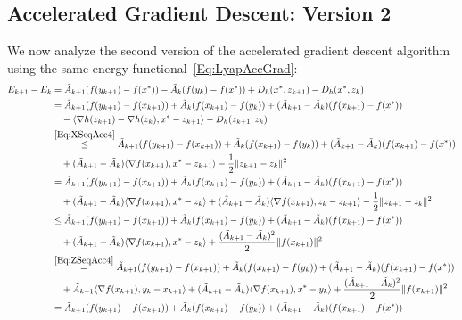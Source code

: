 \documentclass[11pt]{article}
\theoremstyle{plain}
\begin{document}
\subsection{Accelerated Gradient Descent: Version 2}
We now analyze the second version of the accelerated gradient descent algorithm using the same energy functional~\eqref{Eq:LyapAccGrad}:
\begin{align*}
E_{k+1} - E_k &= \tilde A_{k+1}(f(y_{k+1}) - f(x^\ast)) - \tilde A_{k}(f(y_{k}) - f(x^\ast)) + D_h(x^\ast, z_{k+1}) - D_h(x^\ast, z_{k}) \\
& = \tilde A_{k+1}(f(y_{k+1}) - f(x_{k+1})) + \tilde A_{k}(f(x_{k+1}) - f(y_{k})) + (\tilde A_{k+1} - \tilde A_k)(f(x_{k+1}) - f(x^\ast)) \\
&\quad - \langle \nabla h(z_{k+1}) - \nabla h(z_k), x^\ast - z_{k+1}\rangle - D_h(z_{k+1}, z_k)\\
& \overset{\eqref{Eq:XSeqAcc4}}{\leq} \tilde A_{k+1}(f(y_{k+1}) - f(x_{k+1})) + \tilde A_{k}(f(x_{k+1}) - f(y_{k})) + (\tilde A_{k+1} - \tilde A_k)(f(x_{k+1}) - f(x^\ast)) \\
&\quad + (\tilde A_{k+1} - \tilde A_k)\langle \nabla f(x_{k+1}), x^\ast - z_{k+1}\rangle - \frac{1}{2}\|z_{k+1} - z_k\|^2\\
& = \tilde A_{k+1}(f(y_{k+1}) - f(x_{k+1})) + \tilde A_{k}(f(x_{k+1}) - f(y_{k})) + (\tilde A_{k+1} - \tilde A_k)(f(x_{k+1}) - f(x^\ast)) \\
&\quad  + (\tilde A_{k+1} - \tilde A_k)\langle \nabla f(x_{k+1}), x^\ast - z_{k}\rangle + (\tilde A_{k+1} - \tilde A_k)\langle \nabla f(x_{k+1}),  z_{k} - z_{k+1}\rangle- \frac{1}{2}\|z_{k+1} - z_k\|^2\\
& \leq \tilde A_{k+1}(f(y_{k+1}) - f(x_{k+1})) + \tilde A_{k}(f(x_{k+1}) - f(y_{k})) + (\tilde A_{k+1} - \tilde A_k)(f(x_{k+1}) - f(x^\ast)) \\
&\quad  + (\tilde A_{k+1} - \tilde A_k)\langle \nabla f(x_{k+1}), x^\ast - z_{k}\rangle + \frac{(\tilde A_{k+1} - \tilde A_k)^2}{2}\|f(x_{k+1})\|^2 \\
& \overset{\eqref{Eq:ZSeqAcc4}}{=}\tilde A_{k+1}(f(y_{k+1}) - f(x_{k+1})) + \tilde A_{k}(f(x_{k+1}) - f(y_{k})) + (\tilde A_{k+1} - \tilde A_k)(f(x_{k+1}) - f(x^\ast)) \\
&\quad  + \tilde A_{k+1} \langle \nabla f(x_{k+1}),  y_k - x_{k+1}\rangle + (\tilde A_{k+1} - \tilde A_k)\langle \nabla f(x_{k+1}), x^\ast - y_k\rangle + \frac{(\tilde A_{k+1} - \tilde A_k)^2}{2}\|f(x_{k+1})\|^2 \\
& =\tilde A_{k+1}(f(y_{k+1}) - f(x_{k+1})) + \tilde A_{k}(f(x_{k+1}) - f(y_{k})) + (\tilde A_{k+1} - \tilde A_k)(f(x_{k+1}) - f(x^\ast)) \\

\end{align*}
\end{document}
